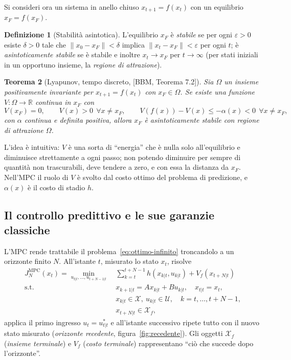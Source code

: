 \documentclass[11pt,a4paper]{article}
\theoremstyle{definition}
\newtheorem{definizione}{Definizione}[section]
\theoremstyle{plain}
\newtheorem{teorema}[definizione]{Teorema}
\theoremstyle{remark}
\newcommand{\R}{\mathbb{R}}
\newcommand{\Xc}{\mathcal{X}}
\newcommand{\Uc}{\mathcal{U}}
\newcommand{\Xf}{\mathcal{X}_f}
\newcommand{\libro}[1]{\textup{[BBM, #1]}} %
\begin{document}
Si consideri ora un sistema in anello chiuso $x_{t+1}=f(x_t)$ con un
equilibrio $x_F=f(x_F)$.

\begin{definizione}[Stabilità asintotica]
L'equilibrio $x_F$ è \emph{stabile} se per ogni $\varepsilon>0$ esiste
$\delta>0$ tale che $\|x_0-x_F\|<\delta$ implica $\|x_t-x_F\|<\varepsilon$
per ogni $t$; è \emph{asintoticamente stabile} se è stabile e inoltre
$x_t\to x_F$ per $t\to\infty$ (per stati iniziali in un opportuno insieme,
la \emph{regione di attrazione}).
\end{definizione}

\begin{teorema}[Lyapunov, tempo discreto, \libro{Teorema 7.2}]\label{teo:lyapunov}
Sia $\Omega$ un insieme positivamente invariante per $x_{t+1}=f(x_t)$ con
$x_F\in\Omega$. Se esiste una funzione $V:\Omega\to\R$ continua in $x_F$ con
\[
  V(x_F)=0,\qquad V(x)>0\ \ \forall x\ne x_F,\qquad
  V(f(x)) - V(x) \le -\alpha(x) < 0\ \ \forall x\ne x_F,
\]
con $\alpha$ continua e definita positiva, allora $x_F$ è asintoticamente
stabile con regione di attrazione $\Omega$.
\end{teorema}

L'idea è intuitiva: $V$ è una sorta di ``energia'' che è nulla solo
all'equilibrio e diminuisce strettamente a ogni passo; non potendo diminuire
per sempre di quantità non trascurabili, deve tendere a zero, e con essa la
distanza da $x_F$. Nell'MPC il ruolo di $V$ è svolto dal costo ottimo del
problema di predizione, e $\alpha(x)$ è il costo di stadio $h$.

\subsection{Il controllo predittivo e le sue garanzie classiche}\label{sec:mpc}

L'MPC rende trattabile il problema~\eqref{eq:ottimo-infinito} troncandolo a un
orizzonte finito $N$. All'istante $t$, misurato lo stato $x_t$, risolve
\begin{equation}\label{eq:mpc}
\begin{aligned}
  J^{\mathrm{MPC}}_N(x_t) = \min_{u_{t|t},\dots,u_{t+N-1|t}}\ &
  \sum_{k=t}^{t+N-1} h(x_{k|t},u_{k|t}) + V_f(x_{t+N|t})\\
  \text{s.t. }\ & x_{k+1|t} = Ax_{k|t} + Bu_{k|t},\quad x_{t|t}=x_t,\\
  & x_{k|t}\in\Xc,\ u_{k|t}\in\Uc,\quad k=t,\dots,t+N-1,\\
  & x_{t+N|t}\in\Xf,
\end{aligned}
\end{equation}
applica il primo ingresso $u_t = u^*_{t|t}$ e all'istante successivo ripete
tutto con il nuovo stato misurato (\emph{orizzonte recedente}, figura~\ref{fig:recedente}).
Gli oggetti $\Xf$ (\emph{insieme terminale}) e $V_f$ (\emph{costo terminale})
rappresentano ``ciò che succede dopo l'orizzonte''.
\end{document}
